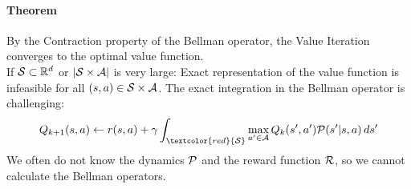 \documentclass[11pt]{article}
\begin{document}
\paragraph{Theorem}
By the Contraction property of the Bellman operator, the Value Iteration converges to the optimal value function.\\
 If $\mathcal{S} \subset \mathbb{R}^d$ or $|\mathcal{S} \times \mathcal{A}|$ is very large:
Exact representation of the value function is infeasible for all $(s,a) \in \mathcal{S} \times \mathcal{A}$. The exact integration in the Bellman operator is challenging:
$$Q_{k+1}(s,a) \leftarrow r(s,a) + \gamma\int_{\textcolor{red}{\mc{S}}} \underset{a' \in \mc{A}}{\max}\, Q_k(s',a')\mc{P}(s'|s,a)\, ds'$$
We often do not know the dynamics $\mathcal{P}$ and the reward function $\mathcal{R}$, so we cannot calculate the Bellman operators.
\end{document}
